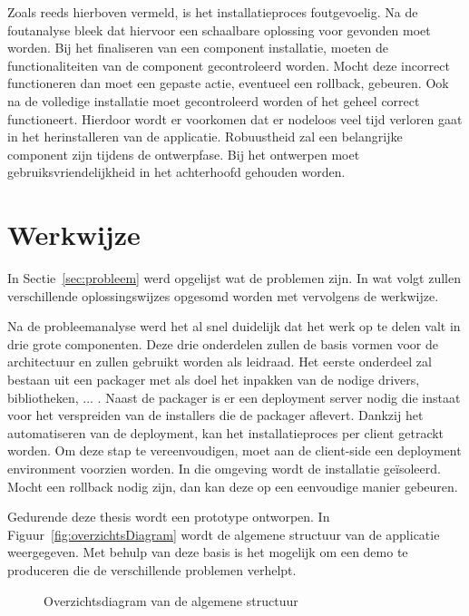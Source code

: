 Zoals reeds hierboven vermeld, is het installatieproces foutgevoelig.
Na de foutanalyse bleek dat hiervoor een schaalbare oplossing voor gevonden moet worden.
Bij het finaliseren van een component installatie, moeten de functionaliteiten van de component gecontroleerd worden.
Mocht deze incorrect functioneren dan moet een gepaste actie, eventueel een rollback, gebeuren. 
Ook na de volledige installatie moet gecontroleerd worden of het geheel correct functioneert.
Hierdoor wordt er voorkomen dat er nodeloos veel tijd verloren gaat in het herinstalleren van de applicatie.
Robuustheid zal een belangrijke component zijn tijdens de ontwerpfase.
Bij het ontwerpen moet gebruiksvriendelijkheid in het achterhoofd gehouden worden.

\section{Werkwijze}
In Sectie~\ref{sec:probleem} werd opgelijst wat de problemen zijn. 
In wat volgt zullen verschillende oplossingswijzes opgesomd worden met vervolgens de werkwijze.

Na de probleemanalyse werd het al snel duidelijk dat het werk op te delen valt in drie grote componenten.
Deze drie onderdelen zullen de basis vormen voor de architectuur en zullen gebruikt worden als leidraad.
Het eerste onderdeel zal bestaan uit een packager met als doel het inpakken van de nodige drivers, bibliotheken, ... .
Naast de packager is er een deployment server nodig die instaat voor het verspreiden van de installers die de packager aflevert.
Dankzij het automatiseren van de deployment, kan het installatieproces per client getrackt worden. %
Om deze stap te vereenvoudigen, moet aan de client-side een deployment environment voorzien worden.
In die omgeving wordt de installatie geïsoleerd.
Mocht een rollback nodig zijn, dan kan deze op een eenvoudige manier gebeuren.

Gedurende deze thesis wordt een prototype ontworpen.
In Figuur~\vref{fig:overzichtsDiagram} wordt de algemene structuur van de applicatie weergegeven.
Met behulp van deze basis is het mogelijk om een demo te produceren die de verschillende problemen verhelpt.

\begin{figure}[!hbt]
\centering
  
  \caption{Overzichtsdiagram van de algemene structuur}
  \label{fig:overzichtsDiagram}
\end{figure}

